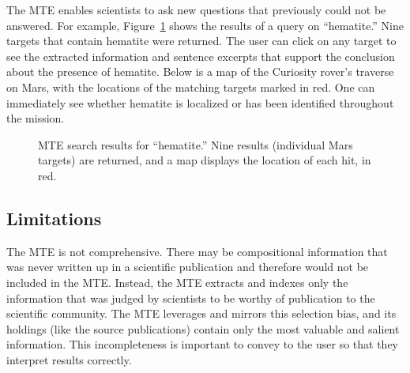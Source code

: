 \documentclass[letterpaper]{article} %
\begin{document}
The MTE enables scientists to ask new questions that previously could
not be answered.  For example, Figure~\ref{fig:mtesearch} shows the
results of a query on ``hematite.''  Nine targets that contain
hematite were returned.  The user can click on any target to see the
extracted information and sentence excerpts that support the
conclusion about the presence of hematite.  Below is a map
of the Curiosity rover's traverse on Mars, with the locations of the
matching targets marked in red.  One can immediately see whether
hematite is localized or has been identified throughout the mission.

\begin{figure}
\begin{center}
\end{center}
\caption{MTE search results for ``hematite.''  Nine results
(individual Mars targets) are returned, and a map displays the
location of each hit, in red.}
\label{fig:mtesearch}
\end{figure}

\subsection{Limitations}

The MTE is not comprehensive.  There may be compositional information
that was never written up in a scientific publication and therefore
would not be included in the MTE.  Instead, the MTE extracts and
indexes only the information that was judged by scientists to be
worthy of publication to the scientific community.  The MTE leverages
and mirrors this selection bias, and its holdings (like the source
publications) contain only the most valuable and salient information.
This incompleteness is important to convey to the user so that
they interpret results correctly.
\end{document}
